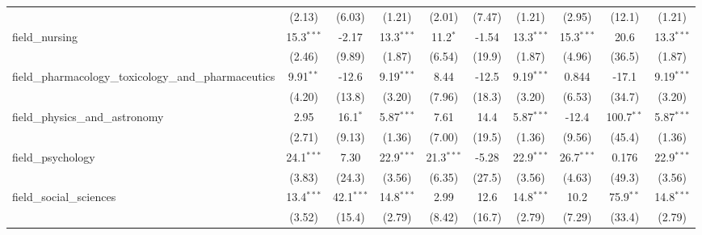 \begin{tabular}{lccccccccc}
                                                               & (2.13)        & (6.03)        & (1.21)        & (2.01)        & (7.47)         & (1.21)        & (2.95)        & (12.1)         & (1.21)\\   
   field\_nursing                                              & 15.3$^{***}$  & -2.17         & 13.3$^{***}$  & 11.2$^{*}$    & -1.54          & 13.3$^{***}$  & 15.3$^{***}$  & 20.6           & 13.3$^{***}$\\   
                                                               & (2.46)        & (9.89)        & (1.87)        & (6.54)        & (19.9)         & (1.87)        & (4.96)        & (36.5)         & (1.87)\\   
   field\_pharmacology\_toxicology\_and\_pharmaceutics         & 9.91$^{**}$   & -12.6         & 9.19$^{***}$  & 8.44          & -12.5          & 9.19$^{***}$  & 0.844         & -17.1          & 9.19$^{***}$\\   
                                                               & (4.20)        & (13.8)        & (3.20)        & (7.96)        & (18.3)         & (3.20)        & (6.53)        & (34.7)         & (3.20)\\   
   field\_physics\_and\_astronomy                              & 2.95          & 16.1$^{*}$    & 5.87$^{***}$  & 7.61          & 14.4           & 5.87$^{***}$  & -12.4         & 100.7$^{**}$   & 5.87$^{***}$\\   
                                                               & (2.71)        & (9.13)        & (1.36)        & (7.00)        & (19.5)         & (1.36)        & (9.56)        & (45.4)         & (1.36)\\   
   field\_psychology                                           & 24.1$^{***}$  & 7.30          & 22.9$^{***}$  & 21.3$^{***}$  & -5.28          & 22.9$^{***}$  & 26.7$^{***}$  & 0.176          & 22.9$^{***}$\\   
                                                               & (3.83)        & (24.3)        & (3.56)        & (6.35)        & (27.5)         & (3.56)        & (4.63)        & (49.3)         & (3.56)\\   
   field\_social\_sciences                                     & 13.4$^{***}$  & 42.1$^{***}$  & 14.8$^{***}$  & 2.99          & 12.6           & 14.8$^{***}$  & 10.2          & 75.9$^{**}$    & 14.8$^{***}$\\   
                                                               & (3.52)        & (15.4)        & (2.79)        & (8.42)        & (16.7)         & (2.79)        & (7.29)        & (33.4)         & (2.79)\\   

\end{tabular}
